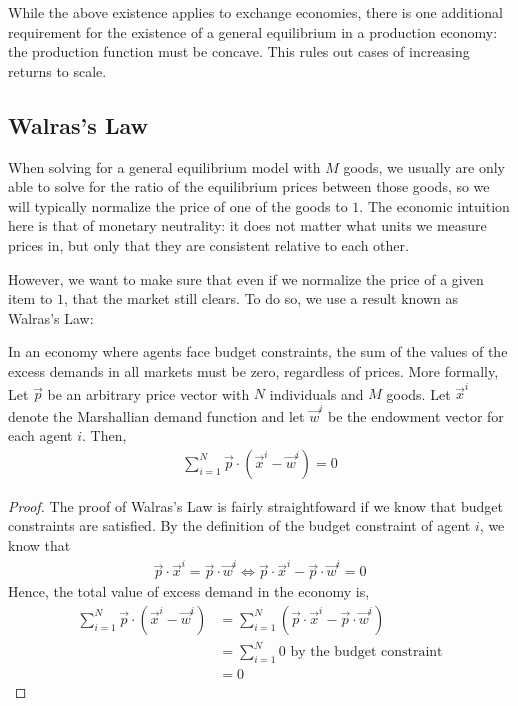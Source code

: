 While the above existence applies to exchange economies, there is one additional requirement for the existence of a general equilibrium in a production economy: the production function must be concave. This rules out cases of increasing returns to scale. 

\subsection*{Walras's Law}
When solving for a general equilibrium model with $M$ goods, we usually are only able to solve for the ratio of the equilibrium prices between those goods, so we will typically normalize the price of one of the goods to $1$. The economic intuition here is that of monetary neutrality: it does not matter what units we measure prices in, but only that they are consistent relative to each other. 

However, we want to make sure that even if we normalize the price of a given item to $1$, that the market still clears. To do so, we use a result known as Walras's Law:

\begin{theorem*}
    In an economy where agents face budget constraints, the sum of the values of the excess demands in all markets must be zero, regardless of prices. More formally, Let $\vec{p}$ be an arbitrary price vector with $N$ individuals and $M$ goods. Let $\vec{x}^i$ denote the Marshallian demand function and let $\vec{w}^i$ be the endowment vector for each agent $i$. Then,
    \begin{align*}
        \sum_{i = 1}^N \vec{p} \cdot (\vec{x}^i - \vec{w}^i) = 0
    \end{align*}
\end{theorem*}
\begin{proof}
    The proof of Walras's Law is fairly straightfoward if we know that budget constraints are satisfied. By the definition of the budget constraint of agent $i$, we know that
    \begin{align*}
        \vec{p} \cdot \vec{x}^i = \vec{p} \cdot \vec{w}^i \iff  \vec{p} \cdot \vec{x}^i - \vec{p} \cdot \vec{w}^i = 0 
    \end{align*}
    Hence, the total value of excess demand in the economy is,
    \begin{align*}
        \sum_{i = 1}^N \vec{p} \cdot (\vec{x}^i - \vec{w}^i) &= \sum_{i = 1}^N  (\vec{p} \cdot \vec{x}^i - \vec{p} \cdot \vec{w}^i) \\
        &= \sum_{i = 1}^N 0 \text{ by the budget constraint}\\
        &= 0 
    \end{align*}
\end{proof}

